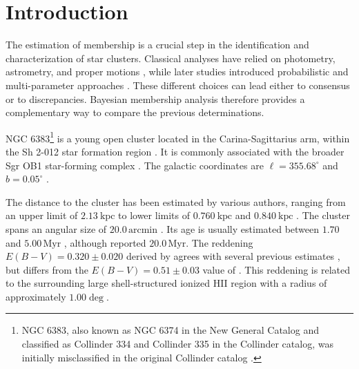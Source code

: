 \documentclass{aa}
\begin{document}


   \maketitle
\nolinenumbers

\section{Introduction}\label{S_intro}
The estimation of membership is a crucial step in the identification and characterization of star clusters. Classical analyses have relied on photometry, astrometry, and proper motions \citep{1930LicOB..14..154T,1949ApJ...110..117S,1978MNRAS.182..607F,1968ArA.....5....1L}, while later studies introduced probabilistic and multi-parameter approaches \citep{1989MNRAS.236..263P,1991MNRAS.249...76B,2005AA...438.1163K,2007AA...462..157P,2018AA...610A..30A}. These different choices can lead either to consensus or to discrepancies. Bayesian membership analysis therefore provides a complementary way to compare the previous determinations.

NGC 6383\footnote{NGC 6383, also known as NGC 6374 in the New General Catalog \citep{2008hsf2.book..497R} and classified as Collinder 334 and Collinder 335 in the Collinder catalog, was initially misclassified in the original Collinder catalog \citep{1931AnLun...2....1C}.} is a young open cluster located in the Carina-Sagittarius arm, within the Sh 2-012 star formation region \citep{1959ApJS....4..257S}. It is commonly associated with the broader Sgr OB1 star-forming complex \citep{2008hsf2.book..497R}. The galactic coordinates are $\ell = 355.68^{\circ}$ and $b = 0.05^{\circ}$ \citep{2017A&A...600A.106C}.

The distance to the cluster has been estimated by various authors, ranging from an upper limit of $2.13~\mathrm{kpc}$ \citep{1930LicOB..14..154T} to lower limits of $0.760~\mathrm{kpc}$ \citep{1949ApJ...110..117S} and $0.840~\mathrm{kpc}$ \citep{2018AA...610A..30A}. The cluster spans an angular size of $20.0\,\textrm{arcmin}$ \citep{2013A&A...560A..76M}. Its age is usually estimated between $1.70$ and $5.00\,\textrm{Myr}$ \citep{1978MNRAS.182..607F,1989MNRAS.236..263P,1991MNRAS.249...76B,2005AA...438.1163K,2007AA...462..157P}, although \citet{1968ArA.....5....1L} reported $20.0\,\textrm{Myr}$. The reddening $E(B-V) = 0.320 \pm 0.020$ derived by \citet{2008hsf2.book..497R} agrees with several previous estimates \citep{1971AAS....4..241B,1978MNRAS.182..607F,1978MNRAS.184..661L,1985AA...151..391T,1989MNRAS.236..263P,1994RMxAA..29..141F,2007AA...462..157P}, but differs from the $E(B-V) = 0.51 \pm 0.03$ value of \citet{2018AA...610A..30A}. This reddening is related to the surrounding large shell-structured ionized HII region with a radius of approximately $1.00\deg$.
\end{document}
